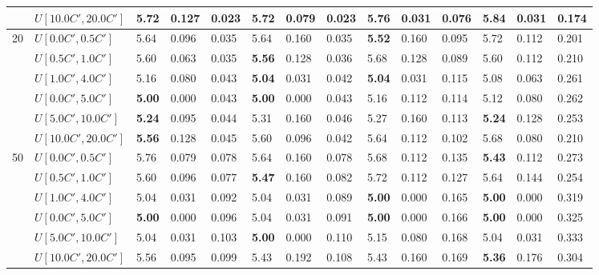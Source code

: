 \begin{table}[h]
{\begin{tabular}{|l|l||l|l|l||l|l|l||l|l|l||l|l|l|}
       & $U[10.0C',20.0C']$ & \textbf{5.72} & 0.127 & 0.023 & \textbf{5.72} & 0.079 & 0.023 & 5.76 & 0.031 & 0.076 & 5.84 & 0.031 & 0.174 \\
      \hline\hline
      \multirow{6}{*}{20} & $U[0.0C',0.5C']$ & 5.64 & 0.096 & 0.035 & 5.64 & 0.160 & 0.035 & \textbf{5.52} & 0.160 & 0.095 & 5.72 & 0.112 & 0.201 \\
       & $U[0.5C',1.0C']$ & 5.60 & 0.063 & 0.035 & \textbf{5.56} & 0.128 & 0.036 & 5.68 & 0.128 & 0.089 & 5.60 & 0.112 & 0.210 \\
       & $U[1.0C',4.0C']$ & 5.16 & 0.080 & 0.043 & \textbf{5.04} & 0.031 & 0.042 & \textbf{5.04} & 0.031 & 0.115 & 5.08 & 0.063 & 0.261 \\
       & $U[0.0C',5.0C']$ & \textbf{5.00} & 0.000 & 0.043 & \textbf{5.00} & 0.000 & 0.043 & 5.16 & 0.112 & 0.114 & 5.12 & 0.080 & 0.262 \\
       & $U[5.0C',10.0C']$ & \textbf{5.24} & 0.095 & 0.044 & 5.31 & 0.160 & 0.046 & 5.27 & 0.160 & 0.113 & \textbf{5.24} & 0.128 & 0.253 \\
       & $U[10.0C',20.0C']$ & \textbf{5.56} & 0.128 & 0.045 & 5.60 & 0.096 & 0.042 & 5.64 & 0.112 & 0.102 & 5.68 & 0.080 & 0.210 \\
      \hline\hline
      \multirow{6}{*}{50} & $U[0.0C',0.5C']$ & 5.76 & 0.079 & 0.078 & 5.64 & 0.160 & 0.078 & 5.68 & 0.112 & 0.135 & \textbf{5.43} & 0.112 & 0.273 \\
       & $U[0.5C',1.0C']$ & 5.60 & 0.096 & 0.077 & \textbf{5.47} & 0.160 & 0.082 & 5.72 & 0.112 & 0.127 & 5.64 & 0.144 & 0.254 \\
       & $U[1.0C',4.0C']$ & 5.04 & 0.031 & 0.092 & 5.04 & 0.031 & 0.089 & \textbf{5.00} & 0.000 & 0.165 & \textbf{5.00} & 0.000 & 0.319 \\
       & $U[0.0C',5.0C']$ & \textbf{5.00} & 0.000 & 0.096 & 5.04 & 0.031 & 0.091 & \textbf{5.00} & 0.000 & 0.166 & \textbf{5.00} & 0.000 & 0.325 \\
       & $U[5.0C',10.0C']$ & 5.04 & 0.031 & 0.103 & \textbf{5.00} & 0.000 & 0.110 & 5.15 & 0.080 & 0.168 & 5.04 & 0.031 & 0.333 \\
       & $U[10.0C',20.0C']$ & 5.56 & 0.095 & 0.099 & 5.43 & 0.192 & 0.108 & 5.43 & 0.160 & 0.169 & \textbf{5.36} & 0.176 & 0.304 \\
      \hline
      \end{tabular}
      }
      \label{tab:pcpn60}\end{table}


